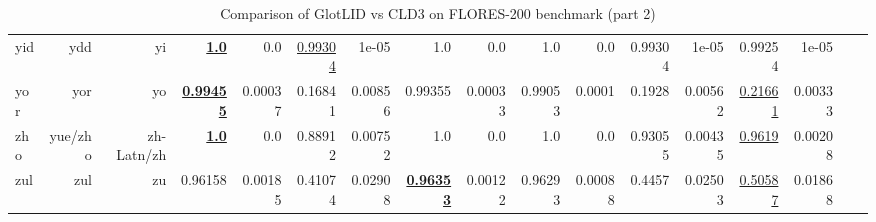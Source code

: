 \documentclass[11pt]{article}
\def\flores{FLORES\xspace}
\begin{document}
\begin{table*}[h]
{\begin{tabular}{lrrrrrrrrrrrrrrrr}
yid         & ydd         & yi         & \textbf{\underline{1.0}}         & 0.0         & \underline{0.99304}         & 1e-05         & 1.0         & 0.0         & 1.0         & 0.0         & 0.99304         & 1e-05         & 0.99254         & 1e-05         \\
yor         & yor         & yo         & \textbf{\underline{0.99455}}         & 0.00037         & 0.16841         & 0.00856         & 0.99355         & 0.00033         & 0.99053         & 0.0001         & 0.1928         & 0.00562         & \underline{0.21661}         & 0.00333         \\
zho         & yue/zho         & zh-Latn/zh         & \textbf{\underline{1.0}}         & 0.0         & 0.88912         & 0.00752         & 1.0         & 0.0         & 1.0         & 0.0         & 0.93055         & 0.00435         & \underline{0.9619}         & 0.00208         \\
zul         & zul         & zu         & 0.96158         & 0.00185         & 0.41074         & 0.02908         & \textbf{\underline{0.96353}}         & 0.00122         & 0.96293         & 0.00088         & 0.4457         & 0.02503         & \underline{0.50587}         & 0.01868         \\
\end{tabular}
}
\caption{Comparison of GlotLID vs CLD3 on \flores-200 benchmark (part 2)}
\label{tab:appendix_glotlid_cld3_floress_2}
\end{table*}
 
\end{document}

